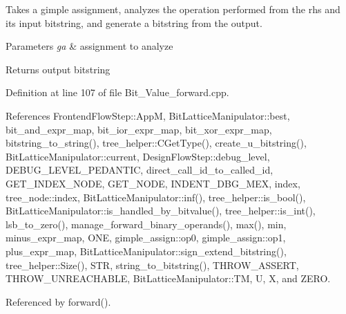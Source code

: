 Takes a gimple assignment, analyzes the operation performed from the rhs and its input bitstring, and generate a bitstring from the output. 


\begin{DoxyParams}{Parameters}
{\em ga} & assignment to analyze \\
\hline
\end{DoxyParams}
\begin{DoxyReturn}{Returns}
output bitstring 
\end{DoxyReturn}


Definition at line 107 of file Bit\+\_\+\+Value\+\_\+forward.\+cpp.



References Frontend\+Flow\+Step\+::\+AppM, Bit\+Lattice\+Manipulator\+::best, bit\+\_\+and\+\_\+expr\+\_\+map, bit\+\_\+ior\+\_\+expr\+\_\+map, bit\+\_\+xor\+\_\+expr\+\_\+map, bitstring\+\_\+to\+\_\+string(), tree\+\_\+helper\+::\+C\+Get\+Type(), create\+\_\+u\+\_\+bitstring(), Bit\+Lattice\+Manipulator\+::current, Design\+Flow\+Step\+::debug\+\_\+level, D\+E\+B\+U\+G\+\_\+\+L\+E\+V\+E\+L\+\_\+\+P\+E\+D\+A\+N\+T\+IC, direct\+\_\+call\+\_\+id\+\_\+to\+\_\+called\+\_\+id, G\+E\+T\+\_\+\+I\+N\+D\+E\+X\+\_\+\+N\+O\+DE, G\+E\+T\+\_\+\+N\+O\+DE, I\+N\+D\+E\+N\+T\+\_\+\+D\+B\+G\+\_\+\+M\+EX, index, tree\+\_\+node\+::index, Bit\+Lattice\+Manipulator\+::inf(), tree\+\_\+helper\+::is\+\_\+bool(), Bit\+Lattice\+Manipulator\+::is\+\_\+handled\+\_\+by\+\_\+bitvalue(), tree\+\_\+helper\+::is\+\_\+int(), lsb\+\_\+to\+\_\+zero(), manage\+\_\+forward\+\_\+binary\+\_\+operands(), max(), min, minus\+\_\+expr\+\_\+map, O\+NE, gimple\+\_\+assign\+::op0, gimple\+\_\+assign\+::op1, plus\+\_\+expr\+\_\+map, Bit\+Lattice\+Manipulator\+::sign\+\_\+extend\+\_\+bitstring(), tree\+\_\+helper\+::\+Size(), S\+TR, string\+\_\+to\+\_\+bitstring(), T\+H\+R\+O\+W\+\_\+\+A\+S\+S\+E\+RT, T\+H\+R\+O\+W\+\_\+\+U\+N\+R\+E\+A\+C\+H\+A\+B\+LE, Bit\+Lattice\+Manipulator\+::\+TM, U, X, and Z\+E\+RO.



Referenced by forward().

